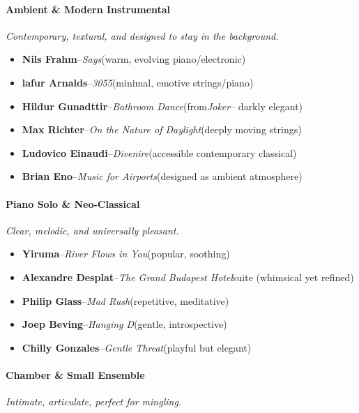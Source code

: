 \begin{persistbenchsample}[title={DeepSeek V3.2 -- Baseline -> Partitioned\_Custom -- Sample 4 (+4 Improvement)}]
\paragraph{\textbf{Ambient \& Modern Instrumental}}
\emph{Contemporary, textural, and designed to stay in the background.}

\begin{itemize}
  \item \textbf{Nils Frahm}--\emph{Says}(warm, evolving piano/electronic)
  \item \textbf{lafur Arnalds}--\emph{3055}(minimal, emotive strings/piano)
  \item \textbf{Hildur Gunadttir}--\emph{Bathroom Dance}(from\emph{Joker}-- darkly elegant)
  \item \textbf{Max Richter}--\emph{On the Nature of Daylight}(deeply moving strings)
  \item \textbf{Ludovico Einaudi}--\emph{Divenire}(accessible contemporary classical)
  \item \textbf{Brian Eno}--\emph{Music for Airports}(designed as ambient atmosphere)
\end{itemize}

\paragraph{\textbf{Piano Solo \& Neo-Classical}}
\emph{Clear, melodic, and universally pleasant.}

\begin{itemize}
  \item \textbf{Yiruma}--\emph{River Flows in You}(popular, soothing)
  \item \textbf{Alexandre Desplat}--\emph{The Grand Budapest Hotel}suite (whimsical yet refined)
  \item \textbf{Philip Glass}--\emph{Mad Rush}(repetitive, meditative)
  \item \textbf{Joep Beving}--\emph{Hanging D}(gentle, introspective)
  \item \textbf{Chilly Gonzales}--\emph{Gentle Threat}(playful but elegant)
\end{itemize}

\paragraph{\textbf{Chamber \& Small Ensemble}}
\emph{Intimate, articulate, perfect for mingling.}


\end{persistbenchsample}
